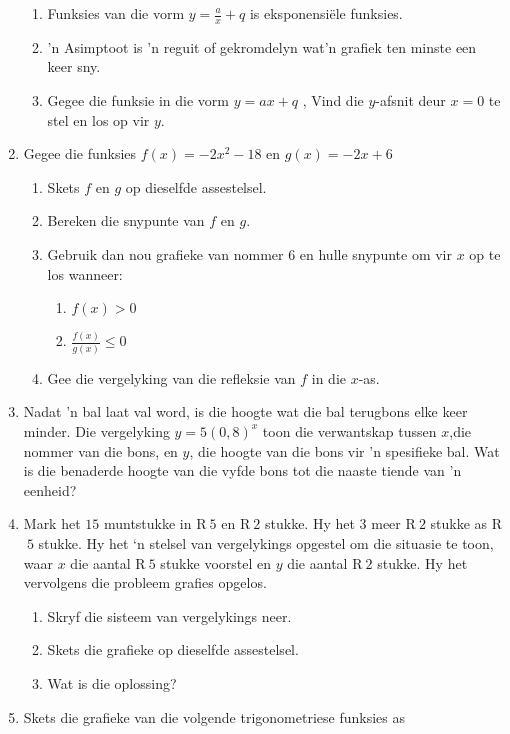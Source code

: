 \begin{eocexercises}{}
\begin{enumerate}[noitemsep, label=\textbf{\arabic*}. ]
\begin{enumerate}[noitemsep, label=\textbf{(\alph*)} ]
    \item Funksies van die vorm $y=\frac{a}{x}+q$ is eksponensiële funksies.
    \item 'n Asimptoot is 'n reguit of gekromdelyn wat'n grafiek ten minste een keer sny. 
    \item Gegee die funksie in die vorm $y=ax+q$ , Vind die $y$-afsnit deur $x=0$ te stel en los op vir $y$.
    \end{enumerate}
\item Gegee die funksies $f(x)=-2{x}^{2}-18$ en $g(x)=-2x+6$
    \begin{enumerate}[noitemsep, label=\textbf{(\alph*)} ]
    \item Skets $f$ en $g$ op dieselfde assestelsel.
    \item Bereken die snypunte van $f$ en $g$.
    \item Gebruik dan nou grafieke van nommer $6$ en hulle snypunte om vir $x$ op te los wanneer:
	\begin{enumerate}[noitemsep, label=\textbf{\roman*}. ] 
	\item $f(x)>0$
	\item $\frac{f(x)}{g(x)}\leq 0$
	\end{enumerate}
    \item Gee die vergelyking van die refleksie van $f$ in die $x$-as.
    \end{enumerate}
\item Nadat ’n bal laat val word, is die hoogte wat die bal terugbons elke keer minder. Die vergelyking $y=5{(0,8)}^{x}$ toon die verwantskap tussen
 $x$,die nommer van die bons, en $y$, die hoogte van die bons vir ’n
spesifieke bal. Wat is die benaderde hoogte van die vyfde bons tot die naaste tiende van ’n eenheid?
\item Mark het $15$ muntstukke in R$~5$ en R$~2$ stukke. Hy het $3$ meer R$~2$ stukke as R$~5$ stukke. Hy het ‘n stelsel
van vergelykings opgestel om die situasie te toon, waar $x$  die aantal R$~5$ stukke voorstel en $y$ die
aantal R$~2$ stukke. Hy het vervolgens die probleem grafies opgelos.
    \begin{enumerate}[noitemsep, label=\textbf{(\alph*)} ]
    \item Skryf die sisteem van vergelykings neer.
    \item Skets die grafieke op dieselfde assestelsel.
    \item Wat is die oplossing?
    \end{enumerate}
 \item Skets die grafieke van die volgende trigonometriese funksies as

\end{enumerate}
\end{eocexercises}
